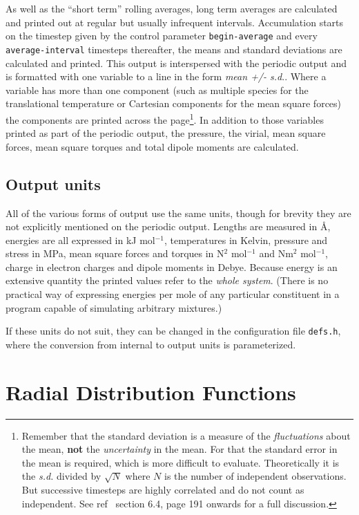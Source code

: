 \documentclass[twoside]{report}
\begin{document}
As well as the ``short term'' rolling averages, long term averages are
calculated and printed out at regular but usually infrequent
intervals.  Accumulation starts on the timestep given by the control
parameter \texttt{begin-average} and every \texttt{average-interval}
timesteps thereafter, the means and standard deviations are calculated
and printed.  This output is interspersed with the periodic output and
is formatted with one variable to a line in the form {\em mean +/-
  s.d}.. Where a variable has more than one component (such as
multiple species for the translational temperature or Cartesian
components for the mean square forces) the components are printed
across the page\footnote{Remember that the standard deviation is a
  measure of the {\em fluctuations\/} about the mean, {\bf not} the
  {\em uncertainty\/} in the mean. For that the standard error in the
  mean is required, which is more difficult to evaluate.
  Theoretically it is the {\em s.d.\/} divided by $\sqrt N$ where $N$
  is the number of independent observations.  But successive timesteps
  are highly correlated and do not count as independent.  See
  ref~\cite{allen:87} section 6.4, page 191 onwards for a full
  discussion.}.  In addition to those variables printed as part of the
periodic output, the pressure, the virial, mean square forces, mean
square torques and total dipole moments are calculated.

\subsection{Output units}
All of the various forms of output use the same units, though for
brevity they are not explicitly mentioned on the periodic output.
Lengths are measured in \AA, energies are all expressed in kJ
mol$^{-1}$, temperatures in Kelvin, pressure and stress in MPa, mean
square forces and torques in N$^2$ mol$^{-1}$ and Nm$^2$
mol$^{-1}$, charge in electron charges and dipole moments in Debye.
Because energy is an extensive quantity the printed values refer to
the {\em whole system}.  (There is no practical way of expressing
energies per mole of any particular constituent in a program capable
of simulating arbitrary mixtures.)

If these units do not suit, they can be changed in the configuration
file \texttt{defs.h}, where the conversion from internal to output units
is parameterized.
\section{Radial Distribution Functions}%
\end{document}

